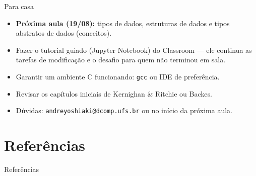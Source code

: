 \documentclass[aspectratio=169]{beamer}
\begin{document}
\begin{frame}{Para casa}
  \begin{itemize}
    \item \textbf{Próxima aula (19/08):} tipos de dados, estruturas de dados e
      tipos abstratos de dados (conceitos).
    \item Fazer o tutorial guiado (Jupyter Notebook) do Classroom --- ele
      continua as tarefas de modificação e o desafio para quem não terminou
      em sala.
    \item Garantir um ambiente C funcionando: \texttt{gcc} ou IDE de preferência.
    \item Revisar os capítulos iniciais de Kernighan \& Ritchie ou Backes.
    \item Dúvidas: \texttt{andreyoshiaki@dcomp.ufs.br} ou no início da próxima aula.
  \end{itemize}
\end{frame}

\section*{Referências}
\begin{frame}[allowframebreaks]{Referências}
  \footnotesize
  \nocite{*}
  
  
\end{frame}
\end{document}
